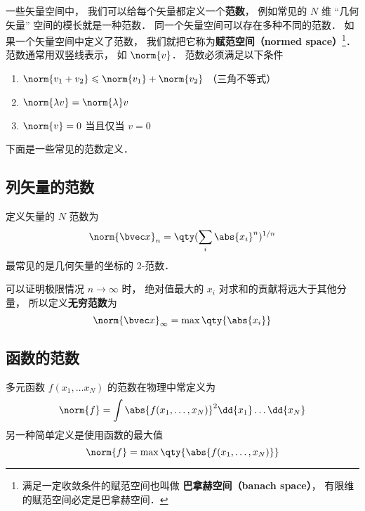

一些矢量空间中， 我们可以给每个矢量都定义一个\textbf{范数}， 例如常见的 $N$ 维 “几何矢量” 空间的模长就是一种范数． 同一个矢量空间可以存在多种不同的范数． 如果一个矢量空间中定义了范数， 我们就把它称为\textbf{赋范空间（normed space）}\footnote{满足一定收敛条件的赋范空间也叫做 \textbf{巴拿赫空间（banach space）}， 有限维的赋范空间必定是巴拿赫空间．%
}． 范数通常用双竖线表示， 如 $\norm{v}$． 范数必须满足以下条件

\begin{enumerate}
\item $\norm{v_1 + v_2} \leqslant \norm{v_1} + \norm{v_2}$ （三角不等式）
\item $\norm{\lambda v} = \norm{\lambda} v$
\item $\norm{v} = 0$ 当且仅当 $v = 0$
\end{enumerate}

下面是一些常见的范数定义．

\subsection{列矢量的范数}
定义矢量的 $N$ 范数为
\begin{equation}
\norm{\bvec x}_n = \qty(\sum_i \abs{x_i}^n)^{1/n}
\end{equation}
最常见的是几何矢量的坐标的 2-范数．


可以证明极限情况 $n \to \infty$ 时， 绝对值最大的 $x_i$ 对求和的贡献将远大于其他分量， 所以定义\textbf{无穷范数}为
\begin{equation}
\norm{\bvec x}_\infty = \max \qty{\abs{x_i}}
\end{equation}

\subsection{函数的范数}
多元函数 $f(x_1, \dots x_N)$ 的范数在物理中常定义为
\begin{equation}
\norm{f} = \int \abs{f(x_1, \dots, x_N)}^2 \dd{x_1}\dots \dd{x_N}
\end{equation}
另一种简单定义是使用函数的最大值
\begin{equation}
\norm{f} = \max\qty{\abs{f(x_1, \dots, x_N)}}
\end{equation}
